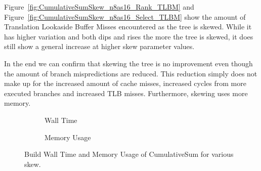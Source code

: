 Figure~\ref{fig:CumulativeSumSkew_n8as16_Rank_TLBM} and Figure~\ref{fig:CumulativeSumSkew_n8as16_Select_TLBM} show the amount of Translation Lookaside Buffer Misses encountered as the tree is skewed.
While it has higher variation and both dips and rises the more the tree is skewed, it does still show a general increase at higher skew parameter values.

In the end we can confirm that skewing the tree is no improvement even though the amount of branch mispredictions are reduced. 
This reduction simply does not make up for the increased amount of cache misses, increased cycles from more executed branches and increased TLB misses. 
Furthermore, skewing uses more memory.

\begin{figure}\tiny
\center
\begin{subfigure}{0.55\textwidth}
	
	\caption{Wall Time}
	\label{fig:CumulativeSumSkew_n8as16_Build_WallTime}
\end{subfigure}

\vspace{1.5cm}
\begin{subfigure}{0.55\textwidth}
	
	\caption{Memory Usage}
	\label{fig:CumulativeSumSkew_n8as16_build_memory}
\end{subfigure}

\caption{Build Wall Time and Memory Usage of CumulativeSum for various skew.}
\label{fig:CumulativeSumSkew_n8as16_Build}
\end{figure}


